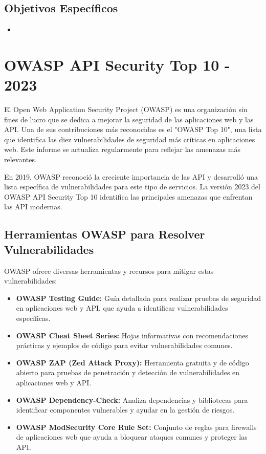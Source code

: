 \documentclass[a4paper,12pt]{article}
\begin{document}
\subsection{Objetivos Espec\'ificos}
\begin{itemize}
    \item 
\end{itemize}

\section{OWASP API Security Top 10 - 2023}

El Open Web Application Security Project (OWASP) es una organización sin fines de lucro que se dedica a mejorar la seguridad de las aplicaciones web y las API. Una de sus contribuciones más reconocidas es el "OWASP Top 10", una lista que identifica las diez vulnerabilidades de seguridad más críticas en aplicaciones web. Este informe se actualiza regularmente para reflejar las amenazas más relevantes.

En 2019, OWASP reconoció la creciente importancia de las API y desarrolló una lista específica de vulnerabilidades para este tipo de servicios. La versión 2023 del OWASP API Security Top 10 identifica las principales amenazas que enfrentan las API modernas.

\subsection{Herramientas OWASP para Resolver Vulnerabilidades}
OWASP ofrece diversas herramientas y recursos para mitigar estas vulnerabilidades:

\begin{itemize}
    \item \textbf{OWASP Testing Guide:} Guía detallada para realizar pruebas de seguridad en aplicaciones web y API, que ayuda a identificar vulnerabilidades específicas.
    \item \textbf{OWASP Cheat Sheet Series:} Hojas informativas con recomendaciones prácticas y ejemplos de código para evitar vulnerabilidades comunes.
    \item \textbf{OWASP ZAP (Zed Attack Proxy):} Herramienta gratuita y de código abierto para pruebas de penetración y detección de vulnerabilidades en aplicaciones web y API.
    \item \textbf{OWASP Dependency-Check:} Analiza dependencias y bibliotecas para identificar componentes vulnerables y ayudar en la gestión de riesgos.
    \item \textbf{OWASP ModSecurity Core Rule Set:} Conjunto de reglas para firewalls de aplicaciones web que ayuda a bloquear ataques comunes y proteger las API.
\end{itemize}
\end{document}
